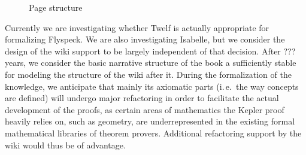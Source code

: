 \newcommand{\wikipage}[5]{\node[draw,text width=5cm,font=\tiny\sffamily] (#1) at #2 {
    {\footnotesize\bfseries #3}\\
    #4
    ~\\[1em]
    [Download Isabelle representation]\\
    #5
  };}
\begin{figure}
  \centering
  \caption{Page structure}
  \label{fig:pagestructure}
\end{figure}

 Currently we are investigating
whether Twelf is actually appropriate for formalizing Flyspeck.  We are also investigating
Isabelle, but we consider the design of the wiki support to be largely independent of that
decision.  After ??? years, we consider the basic narrative
structure of the book a sufficiently stable for modeling the structure of the wiki after
it.  During the formalization of the knowledge, we anticipate that mainly its axiomatic
parts (i.\,e.\ the way concepts are defined) will undergo major refactoring in order to
facilitate the actual development of the proofs, as certain areas of mathematics the
Kepler proof heavily relies on, such as geometry, are underrepresented in the existing
formal mathematical libraries of theorem provers.  Additional refactoring support by the
wiki would thus be of advantage.

